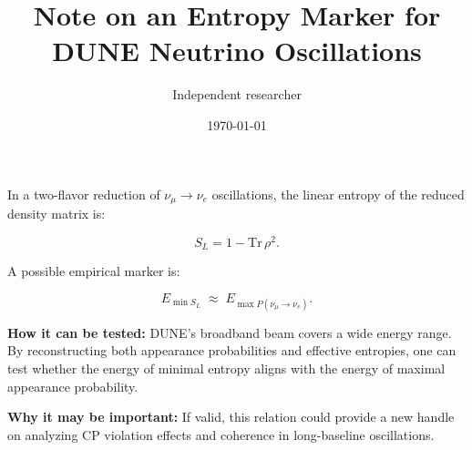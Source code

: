 \documentclass[12pt,a4paper]{article}
\title{Note on an Entropy Marker for DUNE Neutrino Oscillations}
\author{Independent researcher}
\date{\today}
\begin{document}
\maketitle

\noindent
In a two-flavor reduction of $\nu_\mu \to \nu_e$ oscillations, the linear entropy of the reduced density matrix is:

\[
S_L = 1 - \mathrm{Tr}\,\rho^2.
\]

A possible empirical marker is:

\[
E_{\min S_L} \;\approx\; E_{\max P(\nu_\mu\to\nu_e)}.
\]

\textbf{How it can be tested:}  
DUNE’s broadband beam covers a wide energy range. By reconstructing both appearance probabilities and effective entropies, one can test whether the energy of minimal entropy aligns with the energy of maximal appearance probability.

\textbf{Why it may be important:}  
If valid, this relation could provide a new handle on analyzing CP violation effects and coherence in long-baseline oscillations.
\end{document}
